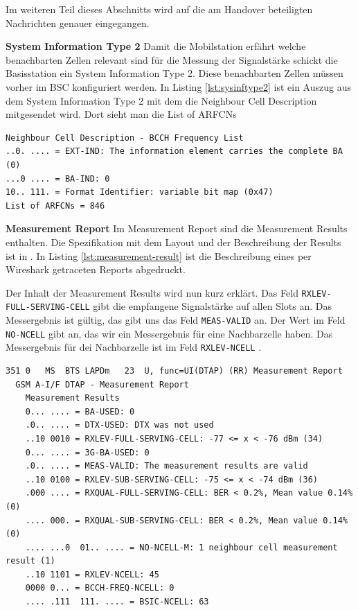 Im weiteren Teil dieses Abschnitts wird auf die am Handover beteiligten Nachrichten genauer eingegangen.

\textbf{System Information Type 2}
Damit die Mobilstation erfährt welche benachbarten Zellen relevant sind für die Messung der Signalstärke schickt die Basisstation ein System Information Type 2. Diese benachbarten Zellen müssen vorher im BSC konfiguriert werden. In Listing \ref{lst:sysinftype2} ist ein Auszug aus dem System Information Type 2 mit dem die Neighbour Cell Description mitgesendet wird. Dort sieht man die List of \glspl{ARFCN}

\begin{lstlisting}[label=lst:sysinftype2,caption={Nachbarzellen im System Information Type 2}]
Neighbour Cell Description - BCCH Frequency List
..0. .... = EXT-IND: The information element carries the complete BA (0)
...0 .... = BA-IND: 0
10.. 111. = Format Identifier: variable bit map (0x47)
List of ARFCNs = 846
\end{lstlisting}

\textbf{Measurement Report}
Im Measurement Report sind die Measurement Results enthalten. Die Spezifikation mit dem Layout und der Beschreibung der Results ist in \cite[10.5.2.20]{bib:3gpp0408}. In Listing \ref{lst:measurement-result} ist die Beschreibung eines per Wireshark getraceten Reports abgedruckt.

Der Inhalt der Measurement Results wird nun kurz erklärt. Das Feld \lstinline{RXLEV-FULL-SERVING-CELL} gibt die empfangene Signalstärke auf allen Slots an. Das Messergebnis ist gültig, das gibt uns das Feld \lstinline{MEAS-VALID} an. Der Wert im Feld \lstinline{NO-NCELL} gibt an, das wir ein Messergebnis für eine Nachbarzelle haben. Das Messergebnis für dei Nachbarzelle ist im Feld \lstinline{RXLEV-NCELL} \cite[Table 10.40]{bib:3gpp0408}.

\begin{lstlisting}[label=lst:measurement-result,caption={Measurement Result}]
351	0	MS	BTS	LAPDm	23	U, func=UI(DTAP) (RR) Measurement Report 
  GSM A-I/F DTAP - Measurement Report
    Measurement Results
    0... .... = BA-USED: 0
    .0.. .... = DTX-USED: DTX was not used
    ..10 0010 = RXLEV-FULL-SERVING-CELL: -77 <= x < -76 dBm (34)
    0... .... = 3G-BA-USED: 0
    .0.. .... = MEAS-VALID: The measurement results are valid
    ..10 0100 = RXLEV-SUB-SERVING-CELL: -75 <= x < -74 dBm (36)
    .000 .... = RXQUAL-FULL-SERVING-CELL: BER < 0.2%, Mean value 0.14% (0)
    .... 000. = RXQUAL-SUB-SERVING-CELL: BER < 0.2%, Mean value 0.14% (0)
    .... ...0  01.. .... = NO-NCELL-M: 1 neighbour cell measurement result (1)
    ..10 1101 = RXLEV-NCELL: 45
    0000 0... = BCCH-FREQ-NCELL: 0
    .... .111  111. .... = BSIC-NCELL: 63
\end{lstlisting}

